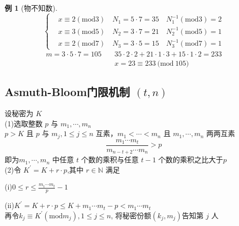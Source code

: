 \documentclass[12pt, a4paper, oneside]{ctexbook}
\newtheorem{example}[theorem]{例}
\begin{document}
\begin{example}[物不知数]
    $$
    \begin{cases}
    &x\equiv2(\mathrm{mod}3)\quad N_1=5\cdot7=35\quad N_1^{-1}(\mathrm{mod}3)=2\\
    &x\equiv3(\mathrm{mod}5)\quad N_2=3\cdot7=21\quad N_2^{-1}(\mathrm{mod}5)=1\\
    &x\equiv2(\mathrm{mod}7)\quad N_3=3\cdot5=15\quad N_3^{-1}(\mathrm{mod}7)=1
    \end{cases}
    $$
    $$\begin{aligned}m=3\cdot5\cdot7=105&\quad35\cdot2\cdot2+21\cdot1\cdot3+15\cdot1\cdot2=233\\&\quad x=23\equiv233\mathrm{~(mod~}105)\end{aligned}$$
\end{example}  

\subsection{Asmuth-Bloom门限机制 $(t,n)$}

设秘密为 $K$\\
(1)选取整数 $p$ 与 $m_1,\cdots,m_n$\\
$p>K$ 且 $p$ 与 $m_j,1\leq j\leq n$ 互素，$m_1<\cdots<m_n$ 且 $m_1,\cdots,m_n$ 两两互素 \\
$$\frac{m_1\cdots m_t}{m_{n-t+2}\cdots m_n}>p$$
即为$m_1,\cdots,m_n$ 中任意 $t$ 个数的乘积与任意 $t-1$ 个数的乘积之比大于$p$\\
(2)令 $K^{\prime}=K+r\cdot p$,其中 $r\in\mathbb{N}$ 满足\par
(i)$0\leq r\leq\frac{m_1\cdots m_t}p-1$\par
(ii)$K^{\prime}=K+r\cdot p\leq K+m_1\cdots m_t-p<m_1\cdots m_t$\\
再令$k_j\equiv K^{\prime}({\mathrm{mod}}m_j),1\leq j\leq n$, 将秘密份额$(k_j,m_j)$告知第 $j$ 人
\end{document}
